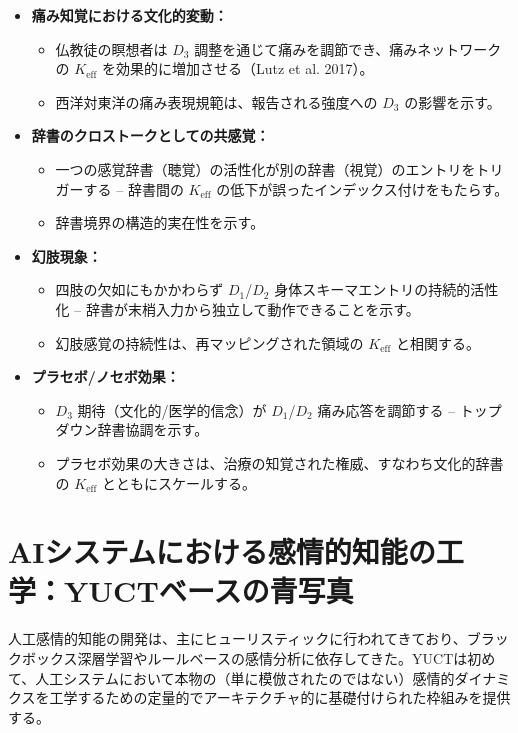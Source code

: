 \documentclass[12pt,a4paper]{article}
\newcommand{\eff}{\mathrm{eff}}
\newcommand{\Ke}{K_{\eff}}
\begin{document}
	\begin{itemize}
		\item \textbf{痛み知覚における文化的変動：}
		\begin{itemize}
			\item 仏教徒の瞑想者は \(D_3\) 調整を通じて痛みを調節でき、痛みネットワークの \(\Ke\) を効果的に増加させる（Lutz et al. 2017）。
			\item 西洋対東洋の痛み表現規範は、報告される強度への \(D_3\) の影響を示す。
		\end{itemize}
		
		\item \textbf{辞書のクロストークとしての共感覚：}
		\begin{itemize}
			\item 一つの感覚辞書（聴覚）の活性化が別の辞書（視覚）のエントリをトリガーする – 辞書間の \(\Ke\) の低下が誤ったインデックス付けをもたらす。
			\item 辞書境界の構造的実在性を示す。
		\end{itemize}
		
		\item \textbf{幻肢現象：}
		\begin{itemize}
			\item 四肢の欠如にもかかわらず \(D_1\)/\(D_2\) 身体スキーマエントリの持続的活性化 – 辞書が末梢入力から独立して動作できることを示す。
			\item 幻肢感覚の持続性は、再マッピングされた領域の \(\Ke\) と相関する。
		\end{itemize}
		
		\item \textbf{プラセボ/ノセボ効果：}
		\begin{itemize}
			\item \(D_3\) 期待（文化的/医学的信念）が \(D_1\)/\(D_2\) 痛み応答を調節する – トップダウン辞書協調を示す。
			\item プラセボ効果の大きさは、治療の知覚された権威、すなわち文化的辞書の \(\Ke\) とともにスケールする。
		\end{itemize}
	\end{itemize}
	
	\section{AIシステムにおける感情的知能の工学：YUCTベースの青写真}
	
	人工感情的知能の開発は、主にヒューリスティックに行われてきており、ブラックボックス深層学習やルールベースの感情分析に依存してきた。YUCTは初めて、人工システムにおいて本物の（単に模倣されたのではない）感情的ダイナミクスを工学するための定量的でアーキテクチャ的に基礎付けられた枠組みを提供する。
	
\end{document}
